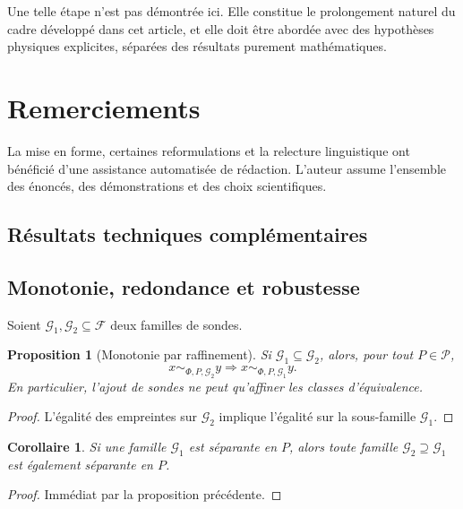 \documentclass[11pt,a4paper]{article}
\newtheorem{proposition}{Proposition}
\newtheorem{corollary}{Corollaire}
\begin{document}
Une telle étape n'est pas démontrée ici. Elle constitue le prolongement naturel du cadre développé dans cet article, et elle doit être abordée avec des hypothèses physiques explicites, séparées des résultats purement mathématiques.

\section*{Remerciements}
La mise en forme, certaines reformulations et la relecture linguistique ont bénéficié d'une assistance automatisée de rédaction. L'auteur assume l'ensemble des énoncés, des démonstrations et des choix scientifiques.





\begin{appendices}

\section{Résultats techniques complémentaires}

\subsection{Monotonie, redondance et robustesse}

Soient \(\mathcal G_1,\mathcal G_2\subseteq\mathcal F\) deux familles de sondes.

\begin{proposition}[Monotonie par raffinement]
Si \(\mathcal G_1\subseteq\mathcal G_2\), alors, pour tout \(P\in\mathcal P\),
\[
x\sim_{\Phi,P,\mathcal G_2}y \Longrightarrow x\sim_{\Phi,P,\mathcal G_1}y.
\]
En particulier, l'ajout de sondes ne peut qu'affiner les classes d'équivalence.
\end{proposition}

\begin{proof}
L'égalité des empreintes sur \(\mathcal G_2\) implique l'égalité sur la sous-famille \(\mathcal G_1\).
\end{proof}

\begin{corollary}
Si une famille \(\mathcal G_1\) est séparante en \(P\), alors toute famille \(\mathcal G_2\supseteq\mathcal G_1\) est également séparante en \(P\).
\end{corollary}

\begin{proof}
Immédiat par la proposition précédente.
\end{proof}


\end{appendices}
\end{document}
